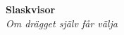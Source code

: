 \begin{center}
    \vspace*{1.5cm}
    {\fontsize{20}{20}\textbf{Slaskvisor}}\\
    \vspace{0.7cm}
    {\fontsize{12}{12}\textit{Om drägget själv får välja}}
\end{center}
\noBackground

\newpage
\noBackground


